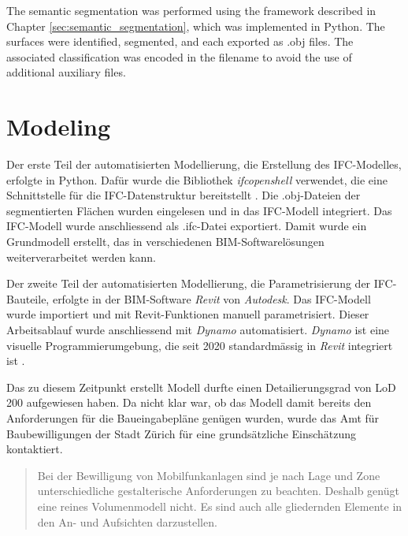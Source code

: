 \begin{English}
    The semantic segmentation was performed using the framework described in Chapter \ref{sec:semantic_segmentation}, which was implemented in Python. The surfaces were identified, segmented, and each exported as .obj files. The associated classification was encoded in the filename to avoid the use of additional auxiliary files.
\end{English}

\section{Modeling}
\begin{German}
    Der erste Teil der automatisierten Modellierung, die Erstellung des IFC-Modelles, erfolgte in Python. Dafür wurde die Bibliothek \textit{ifcopenshell} verwendet, die eine Schnittstelle für die IFC-Datenstruktur bereitstellt \cite{IfcOpenShellOpenSource}. Die .obj-Dateien der segmentierten Flächen wurden eingelesen und in das IFC-Modell integriert. Das IFC-Modell wurde anschliessend als .ifc-Datei exportiert. Damit wurde ein Grundmodell erstellt, das in verschiedenen BIM-Softwarelösungen weiterverarbeitet werden kann.
    
    Der zweite Teil der automatisierten Modellierung, die Parametrisierung der IFC-Bauteile, erfolgte in der BIM-Software \textit{Revit} von \textit{Autodesk}. Das IFC-Modell wurde importiert und mit Revit-Funktionen manuell parametrisiert. Dieser Arbeitsablauf wurde anschliessend mit \textit{Dynamo} automatisiert. \textit{Dynamo} ist eine visuelle Programmierumgebung, die seit 2020 standardmässig in \textit{Revit} integriert ist \cite{DynamoBIM}.
    
    Das zu diesem Zeitpunkt erstellt Modell durfte einen Detailierungsgrad von LoD 200 aufgewiesen haben. Da nicht klar war, ob das Modell damit bereits den Anforderungen für die Baueingabepläne genügen wurden, wurde das Amt für Baubewilligungen der Stadt Zürich für eine grundsätzliche Einschätzung kontaktiert. 
    
    \begin{quote}
        Bei der Bewilligung von Mobilfunkanlagen sind je nach Lage und Zone unterschiedliche gestalterische Anforderungen zu beachten. Deshalb genügt eine reines Volumenmodell nicht. Es sind auch alle gliedernden Elemente in den An- und Aufsichten darzustellen. \cite{amtfurbaubewilligungenthomasfeyerAW_Bachelorarbeit_Anfrage}
    \end{quote}


\end{German}
